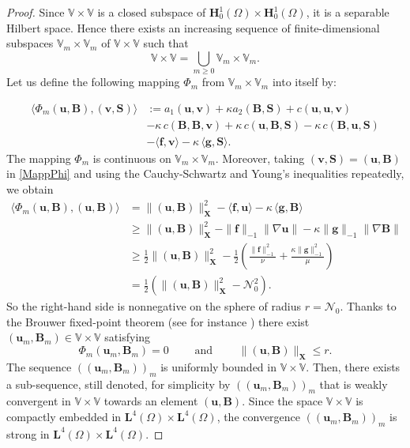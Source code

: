 \documentclass[3p]{elsarticle}
\def\V#1{\mathbf{#1}}
\def\VX{\mathbf{X}}
\newcommand{\Nbd}{\mathcal{N}}
\begin{document}
\begin{proof}
Since $\mathbb{V} \times \mathbb{V}$ is a closed subspace of 
$\V{H}^1_0(\Omega) \times \V{H}^1_0(\Omega) $, it is a separable Hilbert space. Hence there exists an increasing sequence of finite-dimensional subspaces $\mathbb{V}_m \times \mathbb{V}_m$ of $\mathbb{V}\times \mathbb{V} $ 
such that
  $$
  \mathbb{V}\times \mathbb{V} = 
  \underset{m\geq 0}{\bigcup}\mathbb{V}_m \times \mathbb{V}_m.
  $$
Let us define the following mapping $\Phi_m$ from 
$\mathbb{V}_m \times \mathbb{V}_m$ 	 into itself by:

\begin{equation} \label{MappPhi}
\begin{aligned}
\langle \Phi_m( \V{u}, \V{B}), (\V{v},\V{S})\rangle &:=
a_1(\V{u},\V{v}) + \kappa a_2(\V{B},\V{S})
+ c(\V{u},\V{u},\V{v})
\\ & 
- \kappa \,c(\V{B},\V{B},\V{v})
+ \kappa \,c(\V{u},\V{B},\V{S})
- \kappa \,c(\V{B},\V{u},\V{S})
 \\ & 
 - \langle \V{f}, \V{v} \rangle 
- \kappa \,\langle \V{g}, \V{S} \rangle.
 \end{aligned}
\end{equation}
The mapping $\Phi_m$ is continuous on $\mathbb{V}_m \times \mathbb{V}_m$.
Moreover, taking $(\V{v},\V{S})=(\V{u},\V{B})$ in \eqref{MappPhi} and using the Cauchy-Schwartz and Young's inequalities repeatedly, we obtain
\begin{equation*}
\begin{aligned}
\langle \Phi_m( \V{u}, \V{B}), (\V{u}, \V{B})\rangle &=
\|(\V{u},\V{B})\|^2_\VX 
 - \langle \V{f}, \V{u} \rangle 
- \kappa \,\langle \V{g}, \V{B} \rangle
\\ 
& \ge \|(\V{u},\V{B})\|^2_\VX 
- \|\V{f}\|_{-1} \|\nabla \V{u}\| - \kappa \|\V{g}\|_{-1} \|\nabla \V{B}\|
\\ &\ge 
\frac{1}{2}\|(\V{u},\V{B})\|^2_\VX   
- \frac{1}{2} \left( \frac{\|\V{f}\|^2_{-1}}{\nu} + \frac{\kappa \|\V{g}\|^2_{-1}}{\mu} \right) 
\\ & =
\frac{1}{2}\left( \|(\V{u},\V{B})\|^2_\VX   
- \Nbd_0^2 \right).
% 
 \end{aligned}
\end{equation*}
So the right-hand side is nonnegative on the sphere of radius $r=\Nbd_0$. Thanks to the Brouwer fixed-point theorem (see for instance \cite{GirRav1986}) there exist  $(\V{u}_m,\V{B}_m) \in \mathbb{V} \times \mathbb{V} $ satisfying
\begin{equation}\label{Am=0}
 \Phi_m(\V{u}_m,\V{B}_m) = 0\qquad \mbox{ and } 
 \qquad 
\|(\V{u},\V{B})\|_\VX  \le r.    
\end{equation}
The sequence $((\V{u}_m,\V{B}_m))_m$ is uniformly bounded in 
$\mathbb{V} \times \mathbb{V} $. Then, there exists a sub-sequence, still denoted, for simplicity by $((\V{u}_m,\V{B}_m))_m$  that is weakly convergent in $\mathbb{V} \times \mathbb{V} $ towards an element $(\V{u},\V{B})$. 
Since the space $\mathbb{V} \times \mathbb{V} $ is compactly embedded in $\V{L}^4(\Omega)\times \V{L}^4(\Omega)$, the convergence 
$((\V{u}_m,\V{B}_m))_m$  is strong in $\V{L}^4(\Omega)\times \V{L}^4(\Omega)$. 


\end{proof}
\end{document}
